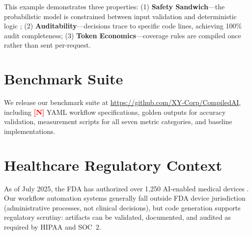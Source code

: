 \documentclass[11pt]{article}
\newcommand{\placeholder}[1]{\textcolor{red}{\textbf{[#1]}}}
\begin{document}
This example demonstrates three properties: (1) \textbf{Safety Sandwich}---the probabilistic model is constrained between input validation and deterministic logic \citep{dalrymple2024guaranteed}; (2) \textbf{Auditability}---decisions trace to specific code lines, achieving 100\% audit completeness; (3) \textbf{Token Economics}---coverage rules are compiled once rather than sent per-request.

\section{Benchmark Suite}
\label{app:benchmark}

We release our benchmark suite at \url{https://github.com/XY-Corp/CompiledAI}, including \placeholder{N} YAML workflow specifications, golden outputs for accuracy validation, measurement scripts for all seven metric categories, and baseline implementations.

\section{Healthcare Regulatory Context}
\label{app:regulatory}

As of July 2025, the FDA has authorized over 1,250 AI-enabled medical devices \citep{fda2025}. Our workflow automation systems generally fall outside FDA device jurisdiction (administrative processes, not clinical decisions), but code generation supports regulatory scrutiny: artifacts can be validated, documented, and audited as required by HIPAA and SOC~2.
\end{document}
